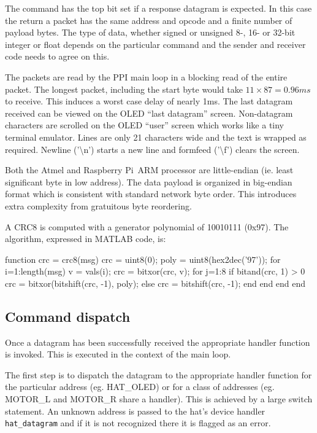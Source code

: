 \documentclass[11pt,fleqn]{article}
\newcommand{\rpi}{Raspberry Pi}
\begin{document}
The command has the top bit set if a response datagram is expected. In this case the return a packet has the same address and opcode and  a finite number of payload bytes.
The type of data, whether signed or unsigned 8-, 16- or 32-bit integer or float depends on the particular command and the sender and receiver code needs to agree on this.
 
The packets are read by the PPI main loop in a blocking read of the entire packet.  The longest packet, including the start byte would take $11 \times 87 = 0.96\unit{ms}$ to receive.
This induces a worst case delay of nearly 1\unit{ms}.
The last datagram received can be viewed on the OLED ``last datagram'' screen.
Non-datagram characters are scrolled on the OLED ``user'' screen which works like a tiny terminal emulator.  Lines are only 21 characters wide and the text is wrapped as required.  Newline ('\textbackslash n') starts a new line and formfeed ('\textbackslash f') clears the screen.

Both the Atmel and \rpi\ ARM processor are little-endian (ie. least significant byte in low address).  The data payload is organized in 
big-endian format which is consistent with standard network byte order.
This introduces extra complexity from gratuitous byte reordering.

A CRC8  is computed with a generator polynomial of 10010111 (0x97).  The algorithm, expressed in MATLAB code, is:
\begin{Code}
        function crc = crc8(msg)
            crc = uint8(0);
            poly = uint8(hex2dec('97'));
            for i=1:length(msg)
                v = vals(i);
                crc = bitxor(crc, v);
                for j=1:8
                    if bitand(crc, 1) > 0
                        crc = bitxor(bitshift(crc, -1), poly);
                    else
                        crc = bitshift(crc, -1);
                    end
                end
            end
        end
\end{Code}

\subsection{Command dispatch}
Once a datagram has been successfully received the appropriate handler function is invoked.  This is executed in the context of the main loop.

The first step is to dispatch the 
datagram to the appropriate  handler function for the particular address (eg. HAT\_OLED) or for a class of addresses (eg. MOTOR\_L and MOTOR\_R share a handler).  This is achieved by a large switch statement.  An unknown address is passed to the hat's device handler \texttt{hat\_datagram} and if it is not recognized there it is flagged as an error.
\end{document}
